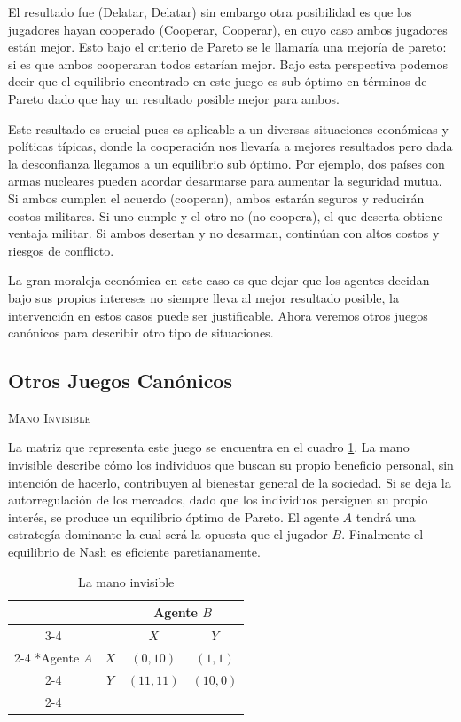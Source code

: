 El resultado fue (Delatar, Delatar) sin embargo otra posibilidad es que los jugadores hayan cooperado (Cooperar, Cooperar), en cuyo caso ambos jugadores están mejor. Esto bajo el criterio de Pareto se le llamaría una mejoría de pareto: si es que ambos cooperaran todos estarían mejor. Bajo esta perspectiva podemos decir que el equilibrio encontrado en este juego es sub-óptimo en términos de Pareto dado que hay un resultado posible mejor para ambos.

Este resultado es crucial pues es aplicable a un diversas situaciones económicas y políticas típicas, donde la cooperación nos llevaría a mejores resultados pero dada la desconfianza llegamos a un equilibrio sub óptimo. Por ejemplo, dos países con armas nucleares pueden acordar desarmarse para aumentar la seguridad mutua. Si ambos cumplen el acuerdo (cooperan), ambos estarán seguros y reducirán costos militares. Si uno cumple y el otro no (no coopera), el que deserta obtiene ventaja militar. Si ambos desertan y no desarman, continúan con altos costos y riesgos de conflicto. 

La gran moraleja económica en este caso es que dejar que los agentes decidan bajo sus propios intereses no siempre lleva al mejor resultado posible, la intervención en estos casos puede ser justificable. Ahora veremos otros juegos canónicos para describir otro tipo de situaciones.

\subsection{Otros Juegos Canónicos}

\textsc{Mano Invisible}

La matriz que representa este juego se encuentra en el cuadro \ref{Juegos: Mano}. La mano invisible describe cómo los individuos que buscan su propio beneficio personal, sin intención de hacerlo, contribuyen al bienestar general de la sociedad. Si se deja la autorregulación de los mercados, dado que los individuos persiguen su propio interés, se produce un equilibrio óptimo de Pareto. El agente $A$ tendrá una estrategía dominante la cual será la opuesta que el jugador $B$. Finalmente el equilibrio de Nash es eficiente paretianamente.

\begin{table}[!htbp]
    \centering
    \caption{La mano invisible}
    \setlength{\extrarowheight}{2pt}
    \begin{tabular}{*{4}{c|}}
      \multicolumn{2}{c}{} & \multicolumn{2}{c}{Agente $B$}\\\cline{3-4}
      \multicolumn{1}{c}{} &  & $X$  & $Y$ \\\cline{2-4}
      \multirow{2}*{Agente $A$}  & $X$ & $(0,10)$ & $(1,1)$ \\\cline{2-4}
      & $Y$ & $(11,11)$ & $(10,0)$ \\\cline{2-4}
    \end{tabular} \label{Juegos: Mano}
  \end{table}

